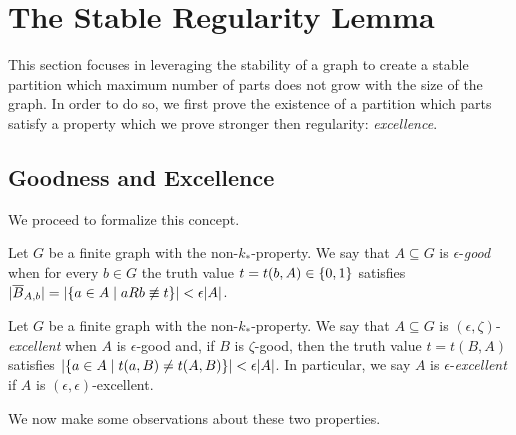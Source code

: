 \section{The Stable Regularity Lemma} \label{sec:section_5}

    This section focuses in leveraging the stability of a graph to create a stable partition which maximum number
    of parts does not grow with the size of the graph.
    In order to do so, we first prove the existence of a partition which parts satisfy a property which we prove stronger
    then regularity: \emph{excellence}.

    \subsection{Goodness and Excellence} \label{subsec:subsection_5.1}

        We proceed to formalize this concept.

        \begin{definition}[Definition 5.2(a)]
            Let $G$ be a finite graph with the non-$k_*$-property.
            We say that $A \subseteq G$ is $\epsilon$-\emph{good} when for every $b \in G$ the truth value
            $t = t(b, A) \in \{ 0, 1 \}$ satisfies
            $| \overline{B}_{A,b} | = | \{ a\in A \mid aRb \not\equiv t \} | < \epsilon |A|$.
        \end{definition}

        \begin{definition}[Definition 5.2(b)]
            Let $G$ be a finite graph with the non-$k_*$-property.
            We say that $A \subseteq G$ is $(\epsilon, \zeta)$-\emph{excellent} when $A$ is $\epsilon$-good and, if $B$ is
            $\zeta$-good, then the truth value $t = t(B,A)$ satisfies $| \{ a \in A \mid t(a,B) \neq t(A,B) \} | < \epsilon |A|$.
            In particular, we say $A$ is $\epsilon$-\emph{excellent} if $A$ is $(\epsilon, \epsilon)$-excellent.
        \end{definition}

        We now make some observations about these two properties.

